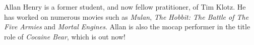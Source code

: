 Allan Henry is a former student, and now fellow pratitioner, of Tim Klotz. He has worked on numerous movies such as \emph{Mulan}, \emph{The Hobbit: The Battle of The Five Armies} and \emph{Mortal Engines}. Allan is also the mocap performer in the title role of \emph{Cocaine Bear}, which is out now!